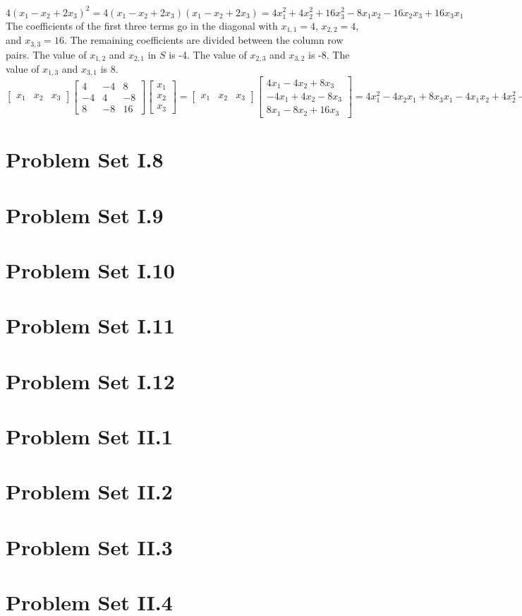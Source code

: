 \documentclass{article}
\renewcommand{\(}{\left(}
\renewcommand{\)}{\right)}
\theoremstyle{plain}
\theoremstyle{plain}
\theoremstyle{definition}
\begin{document}
\begin{enumerate}[label*=\arabic*.,ref=\arabic*]
\begin{shaded}
$4(x_1 - x_2 + 2x_3)^2 = 4(x_1 - x_2 + 2x_3)(x_1 - x_2 + 2x_3) = 4x_1^2 + 4x_2^2 + 16x_3^2 -8x_1x_2 - 16x_2x_3 + 16x_3x_1$ \\

The coefficients of the first three terms go in the diagonal with $x_{1,1} = 4$, $x_{2,2} = 4$, and $x_{3,3} = 16$. The remaining coefficients are divided between the column row pairs. The value of $x_{1,2}$ and $x_{2,1}$ in $S$ is -4. The value of $x_{2,3}$ and $x_{3,2}$ is -8. The value of $x_{1,3}$ and $x_{3,1}$ is 8. \\

$\begin{bmatrix} x_1 & x_2 & x_3 \end{bmatrix} \begin{bmatrix} 4 & -4 & 8 \\ -4 & 4 & -8 \\ 8 & -8 & 16 \end{bmatrix} \begin{bmatrix} x_1 \\ x_2 \\ x_3 \end{bmatrix} = \begin{bmatrix} x_1 & x_2 & x_3 \end{bmatrix} \begin{bmatrix} 4x_1 - 4x_2 + 8x_3 \\ -4x_1 + 4x_2 - 8x_3 \\ 8x_1 - 8x_2 + 16x_3 \end{bmatrix} = 4x_1^2 - 4x_2x_1 + 8x_3x_1 - 4x_1x_2 + 4x_2^2 - 8x_3x_2 + 8x_1x_3 - 8x_2x_3 + 16x_3^2 = 4x_1^2 + 4x_2^2 + 16x_3^2 -8x_1x_2 - 16x_2x_3 + 16x_3x_1$ 
\end{shaded}
\end{enumerate}

\section{Problem Set I.8}
\section{Problem Set I.9}
\section{Problem Set I.10}
\section{Problem Set I.11}
\section{Problem Set I.12}
\section{Problem Set II.1}
\section{Problem Set II.2}
\section{Problem Set II.3}
\section{Problem Set II.4}
\end{document}
